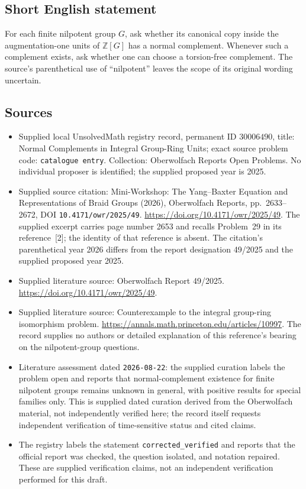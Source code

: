 \documentclass[11pt]{article}
\newcommand{\Z}{\mathbb{Z}}
\begin{document}
\subsection{Short English statement}
For each finite nilpotent group \(G\), ask whether its canonical copy inside the augmentation-one units of \(\Z[G]\) has a normal complement. Whenever such a complement exists, ask whether one can choose a torsion-free complement. The source's parenthetical use of ``nilpotent'' leaves the scope of its original wording uncertain.
\subsection{Sources}
\begin{itemize}
\item Supplied local UnsolvedMath registry record, permanent ID \(30006490\), title: Normal Complements in Integral Group-Ring Units; exact source problem code: \texttt{catalogue entry}. Collection: Oberwolfach Reports Open Problems. No individual proposer is identified; the supplied proposed year is 2025.
\item Supplied source citation: Mini-Workshop: The Yang--Baxter Equation and Representations of Braid Groups (2026), Oberwolfach Reports, pp.~2633--2672, DOI \texttt{10.4171/owr/2025/49}. \url{https://doi.org/10.4171/owr/2025/49}. The supplied excerpt carries page number 2653 and recalls Problem~29 in its reference~[2]; the identity of that reference is absent. The citation's parenthetical year 2026 differs from the report designation 49/2025 and the supplied proposed year 2025.
\item Supplied literature source: Oberwolfach Report 49/2025. \url{https://doi.org/10.4171/owr/2025/49}.
\item Supplied literature source: Counterexample to the integral group-ring isomorphism problem. \url{https://annals.math.princeton.edu/articles/10997}. The record supplies no authors or detailed explanation of this reference's bearing on the nilpotent-group questions.
\item Literature assessment dated \texttt{2026-08-22}: the supplied curation labels the problem open and reports that normal-complement existence for finite nilpotent groups remains unknown in general, with positive results for special families only. This is supplied dated curation derived from the Oberwolfach material, not independently verified here; the record itself requests independent verification of time-sensitive status and cited claims.
\item The registry labels the statement \texttt{corrected\_verified} and reports that the official report was checked, the question isolated, and notation repaired. These are supplied verification claims, not an independent verification performed for this draft.
\end{itemize}
\end{document}
